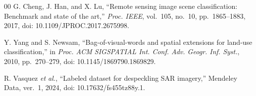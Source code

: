 \documentclass[conference]{IEEEtran}
\begin{document}
\begin{thebibliography}{00}
G. Cheng, J. Han, and X. Lu, ``Remote sensing image scene classification: Benchmark and state of the art,'' \emph{Proc. IEEE}, vol.~105, no.~10, pp.~1865--1883, 2017, doi: 10.1109/JPROC.2017.2675998.

Y. Yang and S. Newsam, ``Bag-of-visual-words and spatial extensions for land-use classification,'' in \emph{Proc. ACM SIGSPATIAL Int. Conf. Adv. Geogr. Inf. Syst.}, 2010, pp.~270--279, doi: 10.1145/1869790.1869829.

R. Vasquez \emph{et al.}, ``Labeled dataset for despeckling SAR imagery,'' Mendeley Data, ver.~1, 2024, doi: 10.17632/fs455tz88y.1.

\end{thebibliography}
\end{document}
